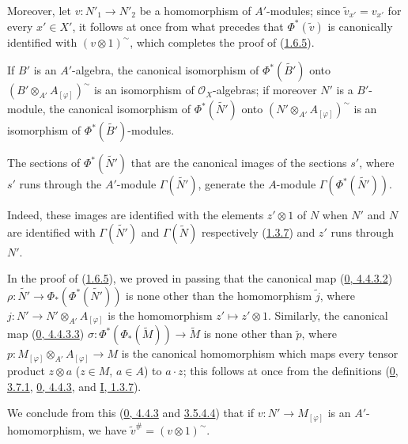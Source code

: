 Moreover, let $v:N'_1\to N'_2$ be a homomorphism of $A'$-modules; since
$\widetilde{v}_{x'}=v_{x'}$ for every $x'\in X'$, it follows at once from
what precedes that $\Phi^*(\widetilde{v})$ is canonically identified with
$(v\otimes 1)^{\sim}$, which completes the proof of
(\hyperref[I.1.6.5]{1.6.5}).

If $B'$ is an $A'$-algebra, the canonical isomorphism of
$\Phi^*(\widetilde{B'})$ onto
$(B'\otimes_{A'}A_{[\varphi]})^{\sim}$ is an isomorphism of
$\mathscr{O}_X$-algebras; if moreover $N'$ is a $B'$-module,
the canonical isomorphism of $\Phi^*(\widetilde{N'})$ onto
$(N'\otimes_{A'}A_{[\varphi]})^{\sim}$ is an isomorphism of
$\Phi^*(\widetilde{B'})$-modules.

\begin{corollary}[1.6.6]
\label{I.1.6.6}
The sections of $\Phi^*(\widetilde{N'})$ that are the canonical images of
the sections $s'$, where $s'$ runs through the $A'$-module
$\Gamma(\widetilde{N'})$, generate the $A$-module
$\Gamma(\Phi^*(\widetilde{N'}))$.
\end{corollary}

Indeed, these images are identified with the elements $z'\otimes 1$ of $N$
when $N'$ and $N$ are identified with $\Gamma(\widetilde{N'})$ and
$\Gamma(\widetilde{N})$ respectively (\hyperref[I.1.3.7]{1.3.7}) and
$z'$ runs through $N'$.

\begin{env}[1.6.7]
\label{I.1.6.7}
In the proof of (\hyperref[I.1.6.5]{1.6.5}), we proved in
passing that the canonical map
(\hyperref[0.4.4.3.2]{0, 4.4.3.2})
$\rho:\widetilde{N'}\to\Phi_*(\Phi^*(\widetilde{N'}))$ is none other than
the homomorphism $\widetilde{j}$,
where $j:N'\to N'\otimes_{A'}A_{[\varphi]}$ is the homomorphism
$z'\mapsto z'\otimes 1$. Similarly, the canonical map
(\hyperref[0.4.4.3.3]{0, 4.4.3.3})
$\sigma:\Phi^*(\Phi_*(\widetilde{M}))\to\widetilde{M}$ is none other than
$\widetilde{p}$, where
$p:M_{[\varphi]}\otimes_{A'}A_{[\varphi]}\to M$ is the canonical
homomorphism which maps every tensor product $z\otimes a$ ($z\in M$,
$a\in A$) to $a\cdot z$; this follows at once from the definitions
(\hyperref[0.3.7.1]{0, 3.7.1},
\hyperref[0.4.4.3]{0, 4.4.3}, and
\hyperref[I.1.3.7]{I, 1.3.7}).

We conclude from this (\hyperref[0.4.4.3]{0, 4.4.3} and
\hyperref[0.3.5.4.4]{3.5.4.4}) that if
$v:N'\to M_{[\varphi]}$ is an $A'$-homomorphism, we have
$\widetilde{v}^{\#}=(v\otimes 1)^{\sim}$.
\end{env}

